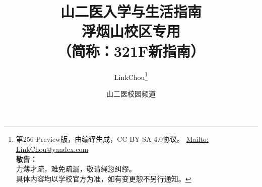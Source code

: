 

\title{%
\normalsize
{\Huge\textbf{山二医入学与生活指南}}\\[6pt]
{\large\textbf{浮烟山校区专用}}\\[15pt]
（简称：321F新指南）\vspace*{-25pt}}
\author{LinkChou\thanks{第256-Preview版，由\textit{\LaTeXe}编译生成，CC BY-SA 4.0协议。%
\uline{\href{Mailto:LinkChou@yandex.com}{Mailto: LinkChou@yandex.com}}\\%
\textbf{敬告：}\\%
\indent\indent 力薄才疏，难免疏漏，敬请绳愆纠缪。\\%
\indent\indent 具体内容均以学校官方为准，如有变更恕不另行通知。}\and 山二医校园频道}
\date{\DTMnow}
\maketitle

\renewcommand{\thefootnote}{\arabic{footnote}}

\tableofcontents
